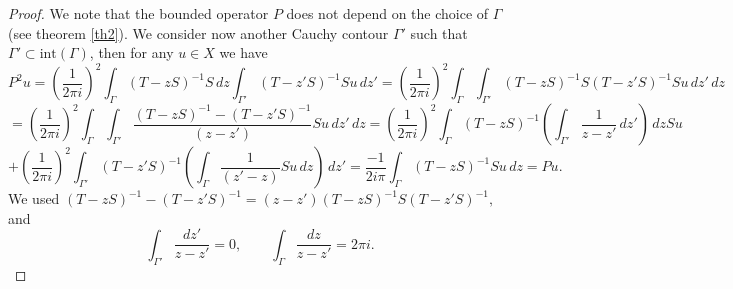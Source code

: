 \documentclass[
11pt,%
tightenlines,%
twoside,%
onecolumn,%
nofloats,%
nobibnotes,%
nofootinbib,%
superscriptaddress,%
noshowpacs,%
centertags]%
{revtex4}
\begin{document}
\begin{proof}We note that the bounded operator $P$ does not depend on the choice of $\Gamma$ (see theorem \ref{th2}).
We consider now another Cauchy contour $\Gamma'$ such that
$\Gamma'\subset\mbox{int}(\Gamma)$, then for any $u\in X$ we have
$$
  P^{2}u = \left(\frac{1}{2\pi i}\right)^{2}\int_{\Gamma}(T-zS)^{-1}S\,dz\int_{\Gamma'}(T-z'S)^{-1}Su\,dz'
   = \left(\frac{1}{2\pi i}\right)^{2}\int_{\Gamma}\int_{\Gamma'}(T-zS)^{-1}S(T-z'S)^{-1}Su\,dz'\,dz
   $$
   $$
    = \left(\frac{1}{2\pi i}\right)^{2}\int_{\Gamma}\int_{\Gamma'}\frac{(T-zS)^{-1}-(T-z'S)^{-1}}{(z-z')}Su\,dz'\,dz
     = \left(\frac{1}{2\pi i}\right)^{2}\int_{\Gamma}(T-zS)^{-1}\left(\int_{\Gamma'}\frac{1}{z-z'}\,dz'\right)\,dzSu
     $$
     $$
     +\left(\frac{1}{2\pi i}\right)^{2}\int_{\Gamma'}(T-z'S)^{-1}\left(\int_{\Gamma}\frac{1}{(z'-z)}Su\,dz\right)\,dz'
      = \frac{-1}{2i\pi}\int_{\Gamma}(T-zS)^{-1}Su\,dz = Pu.
$$
We used
$
(T-zS)^{-1}-(T-z'S)^{-1}=(z-z')(T-zS)^{-1}S(T-z'S)^{-1},
$
and
\begin{equation*}
    \int_{\Gamma'}\frac{dz'}{z-z'}=0,\qquad\int_{\Gamma}\frac{dz}{z-z'}={2\pi i}.
\end{equation*}
\end{proof}
\end{document}
